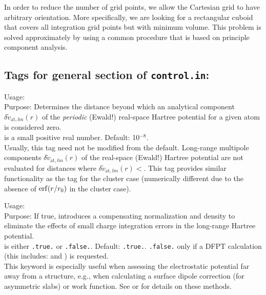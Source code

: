 In order to reduce the number of grid points, we allow the Cartesian grid to
have arbitrary orientation. More specifically, we are looking for a rectangular
cuboid that covers all integration grid points but with minimum volume. This
problem is solved approximately by using a common procedure that is based on
principle component analysis.



\newpage



\subsection*{Tags for general section of \texttt{control.in}:}

{
  \noindent
  Usage:   \\[1.0ex]
  Purpose: Determines the distance beyond which an analytical
    component $\delta\tilde{v}_{\text{at},lm}(r)$ of the
    \emph{periodic} (Ewald!) real-space Hartree 
    potential for a given atom is considered zero. \\[1.0ex]
   is a small positive real number. Default:
    10$^{-8}$. \\
}
Usually, this tag need not be modified from the default. Long-range
multipole components $\delta\tilde{v}_{\text{at},lm}(r)$ of the
real-space (Ewald!) Hartree potential are not evaluated for distances
where $\delta\tilde{v}_{\text{at},lm}(r)<$. This tag
provides similar functionality as the  tag
for the cluster case (numerically different due to the absence of
$\mathop{\mathrm{erf}}(r/r_0)$ in the cluster case).

{
  \noindent
  Usage:   \\[1.0ex]
  Purpose: If true, introduces a compensating normalization and 
    density to eliminate the effects of small charge integration errors 
    in the long-range Hartree potential. \\[1.0ex]
   is either \texttt{.true.} or \texttt{.false.}. Default:
    \texttt{.true.}. \texttt{.false.} only if a DFPT calculation (this includes:
     and ) is requested. \\
}
This keyword is especially useful when assessing the electrostatic potential
far away from a structure, e.g., when calculating a surface dipole correction 
(for asymmetric slabs) or work function. 
See  or  for
details on these methods.

